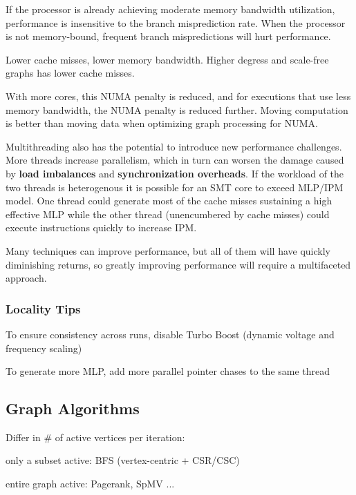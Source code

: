 \documentclass[UTF8,12pt,a4paper]{article}
\begin{document}
If the processor is already achieving moderate memory bandwidth utilization,
performance is insensitive to the branch misprediction rate.
When the processor is not memory-bound,
frequent branch mispredictions will hurt performance.

Lower cache misses, lower memory bandwidth.
Higher degress and scale-free graphs has lower cache misses.

With more cores, this NUMA penalty is reduced,
and for executions that use less memory bandwidth,
the NUMA penalty is reduced further.
Moving computation is better than moving data
when optimizing graph processing for NUMA.

Multithreading also has the potential to introduce new performance challenges.
More threads increase parallelism, which in turn can worsen the damage
caused by \textbf{load imbalances} and \textbf{synchronization overheads}.
If the workload of the two threads is heterogenous it is possible
for an SMT core to exceed MLP/IPM model.
One thread could generate most of the cache misses
sustaining a high effective MLP
while the other thread (unencumbered by cache misses)
could execute instructions quickly to increase IPM.

Many techniques can improve performance,
but all of them will have quickly diminishing returns,
so greatly improving performance will require a multifaceted approach.
\subsubsection{Locality Tips}
\begin{compactitem}
  \item To ensure consistency across runs,
  disable Turbo Boost (dynamic voltage and frequency scaling)
  \item To generate more MLP,
  add more parallel pointer chases to the same thread
\end{compactitem}

\subsection{Graph Algorithms}
Differ in \# of active vertices per iteration:
\begin{compactitem}
  \item only a subset active: BFS (vertex-centric + CSR/CSC)
  \item entire graph active: Pagerank, SpMV ...
\end{compactitem}
\end{document}
